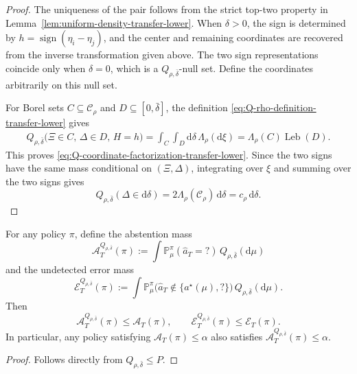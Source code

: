 \documentclass[10pt]{article}
\newcommand{\dd}{\mathrm{d}}
\theoremstyle{plain}
\begin{document}
\begin{proof}
The uniqueness of the pair follows from the strict top-two property in
Lemma~\ref{lem:uniform-density-transfer-lower}. When $\delta>0$, the sign
is determined by $h=\operatorname{sign}(\eta_i-\eta_j)$, and the center
and remaining coordinates are recovered from the inverse transformation
given above. The two sign representations coincide only when $\delta=0$,
which is a $Q_{\rho,\bar\delta}$-null set. Define the coordinates
arbitrarily on this null set.

For Borel sets $C\subseteq\mathcal C_\rho$ and
$D\subseteq[0,\bar\delta]$, the definition
\eqref{eq:Q-rho-definition-transfer-lower} gives
\[
\begin{aligned}
    Q_{\rho,\bar\delta}
    \bigl(
        \Xi\in C,\,
        \Delta\in D,\,
        H=h
    \bigr)
    =
    \int_C\int_D
    \dd\delta\,\Lambda_\rho(\dd\xi)
    =
    \Lambda_\rho(C)\operatorname{Leb}(D).
\end{aligned}
\]
This proves
\eqref{eq:Q-coordinate-factorization-transfer-lower}. Since the two signs
have the same mass conditional on $(\Xi,\Delta)$, integrating over $\xi$ and summing over the
two signs gives
\[
    Q_{\rho,\bar\delta}(\Delta\in\dd\delta)
    =
    2\Lambda_\rho(\mathcal C_\rho)\,\dd\delta
    =
    c_\rho\,\dd\delta.
\]
\end{proof}

\begin{lemma}
\label{lem:risk-domination-transfer-lower}
For any policy $\pi$, define the abstention mass
\[
    \mathcal A_T^{Q_{\rho,\bar\delta}}(\pi)
    :=
    \int
        \mathbb P_\mu^\pi(\widehat a_T=?)
    \,Q_{\rho,\bar\delta}(\dd\mu)
\]
and the undetected error mass
\[
    \mathcal E_T^{Q_{\rho,\bar\delta}}(\pi)
    :=
    \int
        \mathbb P_\mu^\pi
        \bigl(
            \widehat a_T
            \notin
            \{a^\star(\mu),?\}
        \bigr)
    \,Q_{\rho,\bar\delta}(\dd\mu).
\]
Then
\begin{equation}
\label{eq:risk-domination-transfer-lower}
    \mathcal A_T^{Q_{\rho,\bar\delta}}(\pi)
    \le
    \mathcal A_T(\pi),
    \qquad
    \mathcal E_T^{Q_{\rho,\bar\delta}}(\pi)
    \le
    \mathcal E_T(\pi).
\end{equation}
In particular, any policy satisfying
$\mathcal A_T(\pi)\le\alpha$ also satisfies
$\mathcal A_T^{Q_{\rho,\bar\delta}}(\pi)\le\alpha$.
\end{lemma}

\begin{proof}
Follows directly from $Q_{\rho,\bar\delta}\le P$. 
\end{proof}
\end{document}
